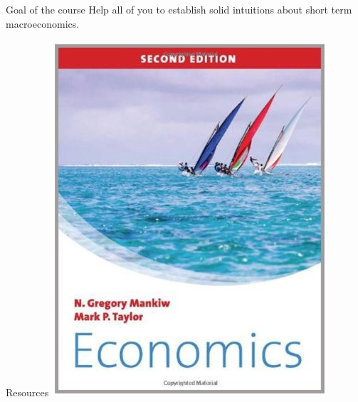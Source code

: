 \begin{frame}
\begin{block}{Goal of the course}
\protect\hypertarget{goal-of-the-course}{}
Help all of you to establish solid intuitions about short term
macroeconomics.
\end{block}
\end{frame}

\begin{frame}{Resources}
\protect\hypertarget{resources}{}
\includegraphics[width=\textwidth,height=0.3\textheight]{assets/mankiw_book.jpg}

\end{frame}
